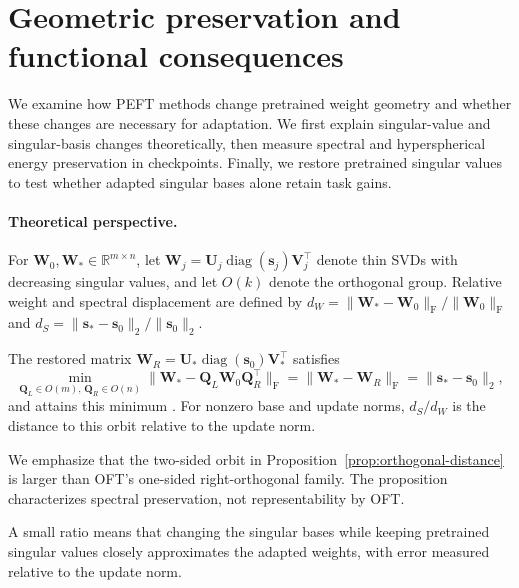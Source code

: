 \FloatBarrier
\section{Geometric preservation and functional consequences}\label{sec:mechanism}\label{sec:restoration}

We examine how PEFT methods change pretrained weight geometry and whether these changes are necessary for adaptation. We first explain singular-value and singular-basis changes theoretically, then measure spectral and hyperspherical energy preservation in checkpoints. Finally, we restore pretrained singular values to test whether adapted singular bases alone retain task gains.

\paragraph{Theoretical perspective.}
For $\bm W_0,\bm W_*\in\mathbb R^{m\times n}$, let $\bm W_j=\bm U_j\operatorname{diag}(\bm s_j)\bm V_j^{\!\top}$ denote thin SVDs with decreasing singular values, and let $O(k)$ denote the orthogonal group.
Relative weight and spectral displacement are defined by
$d_W={\|\bm W_*-\bm W_0\|_{\mathrm{F}}}/{\|\bm W_0\|_{\mathrm{F}}}$
and
$d_S={\|\bm s_*-\bm s_0\|_2}/{\|\bm s_0\|_2}$.

\begin{proposition}\label{prop:orthogonal-distance}
The restored matrix $\bm W_R=\bm U_*\operatorname{diag}(\bm s_0)\bm V_*^{\!\top}$ satisfies
\begin{equation}\label{eq:orthogonal-distance}
\min_{\bm Q_L\in O(m),\,\bm Q_R\in O(n)}
\|\bm W_*-\bm Q_L\bm W_0\bm Q_R^{\!\top}\|_{\mathrm F}
=\|\bm W_*-\bm W_R\|_{\mathrm F}=\|\bm s_*-\bm s_0\|_2,
\end{equation}
and attains this minimum \citep{mirsky1975trace}. For nonzero base and update norms, $d_S/d_W$ is the distance to this orbit relative to the update norm.
\end{proposition}
We emphasize that the two-sided orbit in Proposition~\ref{prop:orthogonal-distance} is larger than OFT's one-sided right-orthogonal family. The proposition characterizes spectral preservation, not representability by OFT.

A small ratio means that changing the singular bases while keeping pretrained singular values closely approximates the adapted weights, with error measured relative to the update norm.


